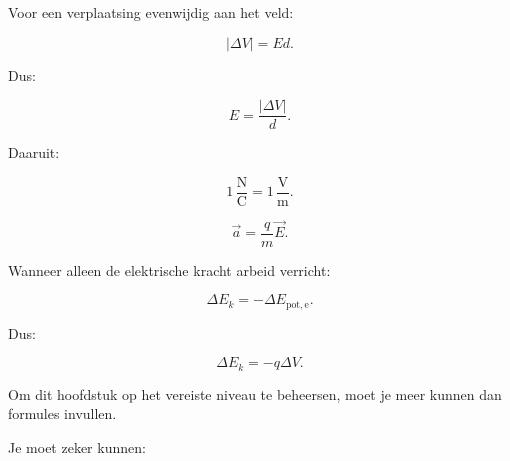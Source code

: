 \documentclass{ximera}
\begin{document}
Voor een verplaatsing evenwijdig aan het veld:

\[
\boxed{
|\Delta V|=Ed.
}
\]

Dus:

\[
\boxed{
E=\frac{|\Delta V|}{d}.
}
\]

Daaruit:

\[
\boxed{
1\,\mathrm{\frac NC}
=
1\,\mathrm{\frac Vm}.
}
\]



\[
\boxed{
\vec a
=
\frac{q}{m}\vec E.
}
\]



Wanneer alleen de elektrische kracht arbeid verricht:

\[
\boxed{
\Delta E_k
=
-\Delta E_{\mathrm{pot,e}}.
}
\]

Dus:

\[
\boxed{
\Delta E_k
=
-q\Delta V.
}
\]




Om dit hoofdstuk op het vereiste niveau te beheersen, moet je meer
kunnen dan formules invullen.

Je moet zeker kunnen:
\end{document}
